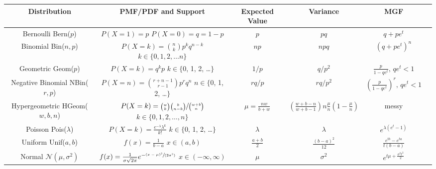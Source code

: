 \documentclass[10pt,landscape]{article}
\newcommand{\N}{\mathcal{N}}
\newcommand{\Bern}{\textrm{Bern}}
\newcommand{\Bin}{\textrm{Bin}}
\newcommand{\Pois}{\textrm{Pois}}
\newcommand{\Unif}{\textrm{Unif}}
\newcommand{\Geom}{\textrm{Geom}}
\newcommand{\NBin}{\textrm{NBin}}
\newcommand{\Hypergeometric}{\textrm{HGeom}}
\begin{document}
\begin{center}
\renewcommand{\arraystretch}{3.7}
\begin{tabular}{cccccc}
\textbf{Distribution} & \textbf{PMF/PDF and Support} & \textbf{Expected Value}  & \textbf{Variance} & \textbf{MGF}\\
\hline 
\shortstack{Bernoulli \\ \Bern($p$)} & \shortstack{$P(X=1) = p$ \\$ P(X=0) = q=1-p$} & $p$ & $pq$ & $q + pe^t$ \\
\hline
\shortstack{Binomial \\ \Bin($n, p$)} & \shortstack{$P(X=k) = {n \choose k}p^k q^{n-k}$  \\ $k \in \{0, 1, 2, \dots n\}$}& $np$ & $npq$ & $(q + pe^t)^n$ \\
\hline
\shortstack{Geometric \\ \Geom($p$)} & \shortstack{$P(X=k) = q^kp$  \\ $k \in \{$0, 1, 2, \dots $\}$}& $1/p$ & $q/p^2$ & $\frac{p}{1-qe^t}, \, qe^t < 1$\\
\hline
\shortstack{Negative Binomial \\ \NBin($r, p$)} & \shortstack{$P(X=n) = {r + n - 1 \choose r -1}p^rq^n$ \\ $n \in \{$0, 1, 2, \dots $\}$} & $rq/p$ & $rq/p^2$ &  $(\frac{p}{1-qe^t})^r, \, qe^t < 1$\\
\hline
\shortstack{Hypergeometric \\ \Hypergeometric($w, b, n$)} & \shortstack{$P(X=k) = \sfrac{{w \choose k}{b \choose n-k}}{{w + b \choose n}}$ \\ $k \in \{0, 1, 2, \dots,  n\}$} & $\mu = \frac{nw}{b+w}$ &$\left(\frac{w+b-n}{w+b-1} \right) n\frac{\mu}{n}(1 - \frac{\mu}{n})$& messy  \\
\hline
\shortstack{Poisson \\ \Pois($\lambda$)} & \shortstack{$P(X=k) = \frac{e^{-\lambda}\lambda^k}{k!}$ \\ $k \in \{$0, 1, 2, \dots $\}$} & $\lambda$ & $\lambda$ & $e^{\lambda(e^t-1)}$ \\
\hline
\hline
\shortstack{Uniform \\ \Unif($a, b$)} & \shortstack{$ f(x) = \frac{1}{b-a}$ \\$ x \in (a, b) $} & $\frac{a+b}{2}$ & $\frac{(b-a)^2}{12}$ &  $\frac{e^{tb}-e^{ta}}{t(b-a)}$\\
\hline
\shortstack{Normal \\ $\N(\mu, \sigma^2)$} & \shortstack{$f(x) = \frac{1}{\sigma \sqrt{2\pi}} e^{-\sfrac{(x - \mu)^2}{(2 \sigma^2)}}$ \\ $x \in (-\infty, \infty)$} & $\mu$  & $\sigma^2$ & $e^{t\mu + \frac{\sigma^2t^2}{2}}$\\

\end{tabular}
\end{center}
\end{document}
